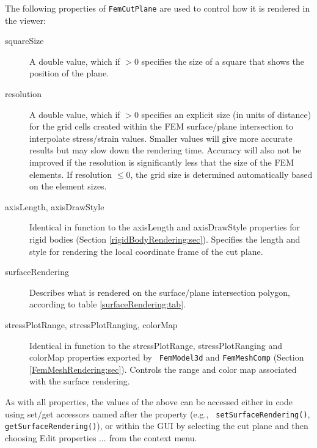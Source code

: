 The following properties of {\tt FemCutPlane} are used to control
how it is rendered in the viewer:

\begin{description}

\item[squareSize]\mbox{}

A double value, which if $> 0$ specifies the size of a square that
shows the position of the plane.

\item[resolution]\mbox{}

A double value, which if $> 0$ specifies an explicit size (in units
of distance) for the grid cells created within the FEM surface/plane
intersection to interpolate stress/strain values. Smaller values will
give more accurate results but may slow down the rendering
time. Accuracy will also not be improved if the resolution is
significantly less that the size of the FEM elements. If {\sf
resolution} $\le 0$, the grid size is determined automatically based
on the element sizes.

\item[axisLength, axisDrawStyle]\mbox{}

Identical in function to the {\sf axisLength} and {\sf axisDrawStyle}
properties for rigid bodies (Section \ref{rigidBodyRendering:sec}).
Specifies the length and style for rendering the local coordinate
frame of the cut plane.

\item[surfaceRendering]\mbox{}

Describes what is rendered on the surface/plane intersection
polygon, according to table \ref{surfaceRendering:tab}.

\item[stressPlotRange, stressPlotRanging, colorMap]\mbox{}

Identical in function to the {\sf stressPlotRange}, {\sf
stressPlotRanging} and {\sf colorMap} properties exported by {\tt
FemModel3d} and {\tt FemMeshComp}
(Section \ref{FemMeshRendering:sec}).  Controls the range and color
map associated with the surface rendering.

\end{description}

As with all properties, the values of the above can be accessed either
in code using set/get accessors named after the property (e.g., {\tt
setSurfaceRendering()}, {\tt getSurfaceRendering()}), or within the
GUI by selecting the cut plane and then choosing {\sf Edit properties
...} from the context menu.

